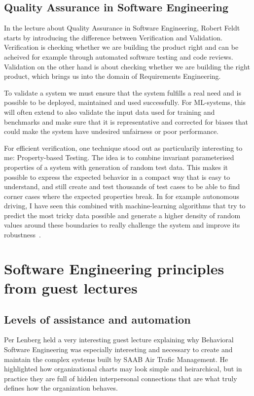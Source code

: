 \documentclass[a4paper,twocolumn]{article}
\begin{document}
\subsection{Quality Assurance in Software Engineering}

In the lecture about Quality Assurance in Software Engineering, Robert Feldt
starts by introducing the difference between Verification and Validation.
Verification is checking whether we are building the product right and can be
acheived for example through automated software testing and code reviews.
Validation on the other hand is about checking whether we are building the right
product, which brings us into the domain of Requirements Engineering. 

To validate a system we must ensure that the system fulfills a real need and is
possible to be deployed, maintained and used successfully. For ML-systems, this
will often extend to also validate the input data used for training and
benchmarks and make sure that it is representative and corrected for biases that
could make the system have undesired unfairness or poor performance.

For efficient verification, one technique stood out as particularily interesting
to me: Property-based Testing. The idea is to combine invariant parameterised
properties of a system with generation of random test data. This makes it
possible to express the expected behavior in a compact way that is easy to
understand, and still create and test thousands of test cases to be able to find
corner cases where the expected properties break. In for example autonomous
driving, I have seen this combined with machine-learning algorithms that try to
predict the most tricky data possible and generate a higher density of random
values around these boundaries to really challenge the system and improve its
robustness~\cite{Song2024}. 

\section{Software Engineering principles from guest lectures}

\subsection{Levels of assistance and automation}
\label{sec:lenberg}

Per Lenberg held a very interesting guest lecture explaining why Behavioral
Software Engineering was especially interesting and necessary to create and
maintain the complex systems built by SAAB Air Trafic Management. He highlighted
how organizational charts may look simple and heirarchical, but in practice they
are full of hidden interpersonal connections that are what truly defines how the
organization behaves. 
\end{document}
